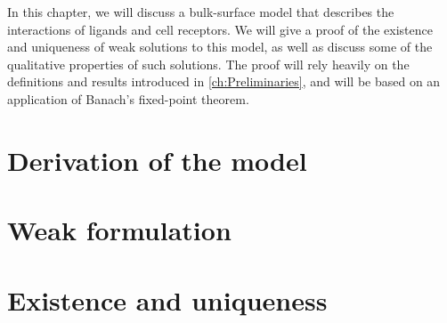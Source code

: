 In this chapter, we will discuss a bulk-surface model that describes the interactions of ligands and cell receptors. We will give a proof of the existence and uniqueness of weak solutions to this model, as well as discuss some of the qualitative properties of such solutions. The proof will rely heavily on the definitions and results introduced in \cref{ch:Preliminaries}, and will be based on an application of Banach's fixed-point theorem.

\section{Derivation of the model}
\label{sec:bio_motiv}


\section{Weak formulation}


\section{Existence and uniqueness}

